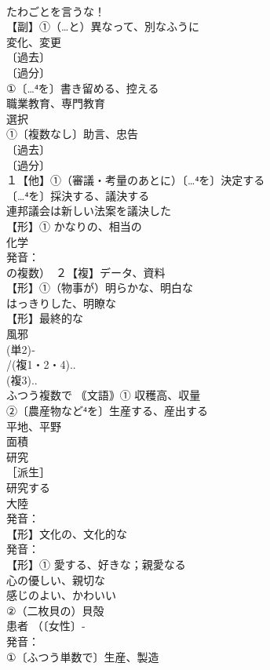 \documentclass[8pt]{extreport}
\begin{document}
\begin{CJK}{UTF8}{min}
\\	たわごとを言うな！
\\	【副】①（…と）異なって、別なふうに
\\	変化、変更 
\\	〔過去〕
\\	〔過分〕
\\	①〔…⁴を〕書き留める、控える
\\	職業教育、専門教育 
\\	選択 
\\	①〔複数なし〕助言、忠告
\\	〔過去〕
\\	〔過分〕
\\	１【他】①（審議・考量のあとに）〔…⁴を〕決定する 
\\	〔…⁴を〕採決する、議決する
\\	連邦議会は新しい法案を議決した 
\\	【形】① かなりの、相当の 
\\	化学 
\\	発音：
\\	の複数）　２【複】データ、資料
\\	【形】①（物事が）明らかな、明白な 
\\	はっきりした、明瞭な
\\	【形】最終的な 
\\	風邪 
\\	(単2)‐
\\	/(複1・2・4)..
\\	(複3)..
\\	ふつう複数で ｟文語｠① 収穫高、収量
\\	②〔農産物など⁴を〕生産する、産出する
\\	平地、平野　
\\	面積
\\	研究 
\\	［派生］ 
\\	研究する
\\	大陸 
\\	発音：
\\	【形】文化の、文化的な 
\\	発音：
\\	【形】① 愛する、好きな；親愛なる 
\\	心の優しい、親切な 
\\	感じのよい、かわいい
\\	②（二枚貝の）貝殻
\\	患者 （〔女性〕‐
\\	発音：
\\	①〔ふつう単数で〕生産、製造 

\end{CJK}
\end{document}
